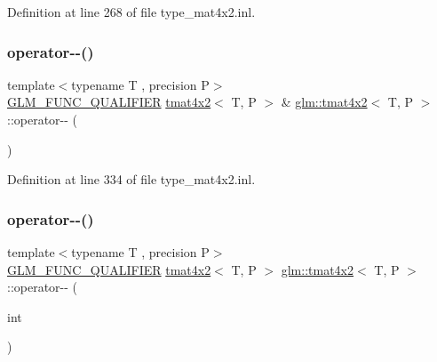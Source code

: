 Definition at line 268 of file type\+\_\+mat4x2.\+inl.

\mbox{\label{structglm_1_1tmat4x2_acb22e08a3abe9442d718346508b76681}} 
\subsubsection{\texorpdfstring{operator-\/-\/()}{operator--()}\hspace{0.1cm}{\footnotesize\ttfamily [1/2]}}
{\footnotesize\ttfamily template$<$typename T , precision P$>$ \\
\mbox{\hyperlink{setup_8hpp_a33fdea6f91c5f834105f7415e2a64407}{G\+L\+M\+\_\+\+F\+U\+N\+C\+\_\+\+Q\+U\+A\+L\+I\+F\+I\+ER}} \mbox{\hyperlink{structglm_1_1tmat4x2}{tmat4x2}}$<$ T, P $>$ \& \mbox{\hyperlink{structglm_1_1tmat4x2}{glm\+::tmat4x2}}$<$ T, P $>$\+::operator-\/-\/ (\begin{DoxyParamCaption}{ }\end{DoxyParamCaption})}



Definition at line 334 of file type\+\_\+mat4x2.\+inl.

\mbox{\label{structglm_1_1tmat4x2_a6e82215ef61cf4f3b4a1cf3bfe21d6fc}} 
\subsubsection{\texorpdfstring{operator-\/-\/()}{operator--()}\hspace{0.1cm}{\footnotesize\ttfamily [2/2]}}
{\footnotesize\ttfamily template$<$typename T , precision P$>$ \\
\mbox{\hyperlink{setup_8hpp_a33fdea6f91c5f834105f7415e2a64407}{G\+L\+M\+\_\+\+F\+U\+N\+C\+\_\+\+Q\+U\+A\+L\+I\+F\+I\+ER}} \mbox{\hyperlink{structglm_1_1tmat4x2}{tmat4x2}}$<$ T, P $>$ \mbox{\hyperlink{structglm_1_1tmat4x2}{glm\+::tmat4x2}}$<$ T, P $>$\+::operator-\/-\/ (\begin{DoxyParamCaption}\item[{int}]{ }\end{DoxyParamCaption})}



